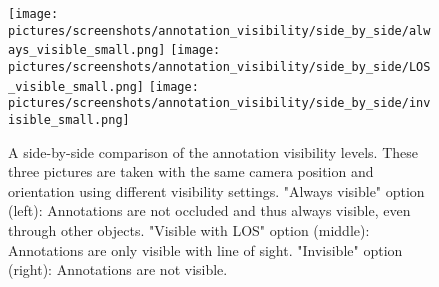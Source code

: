 \begin{figure}%
	\texttt{[image: pictures/screenshots/annotation\_visibility/side\_by\_side/always\_visible\_small.png]}
	\texttt{[image: pictures/screenshots/annotation\_visibility/side\_by\_side/LOS\_visible\_small.png]}
	\texttt{[image: pictures/screenshots/annotation\_visibility/side\_by\_side/invisible\_small.png]}
	\caption[Annotation visibility levels comparison]{A side-by-side comparison of the annotation visibility levels. These three pictures are taken with the same camera position
	and orientation using different visibility settings. 	
	"Always visible" option (left): Annotations are not occluded and thus always visible, even through other objects. %
	"Visible with LOS" option (middle): Annotations are only visible with line of sight. 	
	"Invisible" option (right): Annotations are not visible.}
	\label{fig:visibility_comparison}
\end{figure} 


